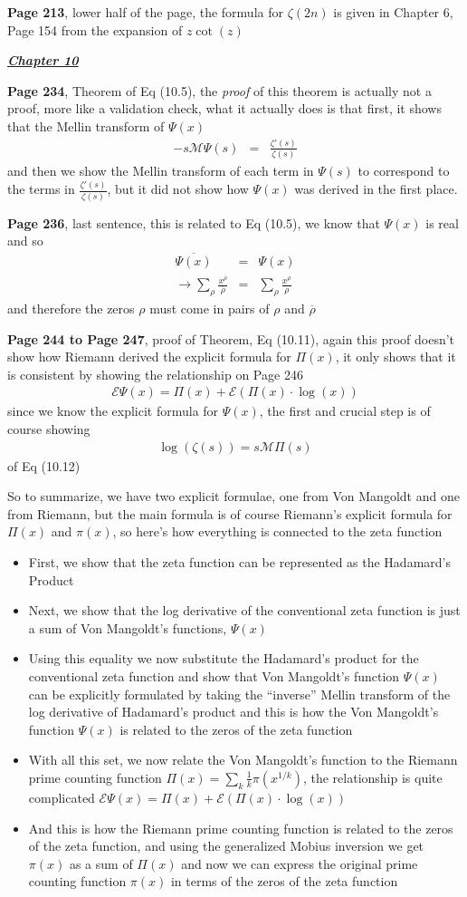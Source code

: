 \documentclass[aps,preprint,preprintnumbers,nofootinbib,showpacs,prd]{revtex4-1}
\newcommand{\bit}{\begin{itemize}}
\newcommand{\eit}{\end{itemize}}
\newcommand{\nbea}{\begin{eqnarray*}}
\newcommand{\neea}{\end{eqnarray*}}
\begin{document}
{\bf Page 213}, lower half of the page, the formula for $\zeta(2n)$ is given in Chapter 6, Page 154 from the expansion of $z\cot(z)$

\bigskip
\underline{\textit{\textbf{Chapter 10}}}
\bigskip

{\bf Page 234}, Theorem of Eq (10.5), the {\it proof} of this theorem is actually not a proof, more like a validation check, what it actually does is that first, it shows that the Mellin transform of $\Psi(x)$
%
\nbea
-s\mathcal{M}\Psi(s) & = & \frac{\zeta'(s)}{\zeta(s)}
\neea
%
and then we show the Mellin transform of each term in $\Psi(s)$ to correspond to the terms in $\frac{\zeta'(s)}{\zeta(s)}$, but it did not show how $\Psi(x)$ was derived in the first place.

{\bf Page 236}, last sentence, this is related to Eq (10.5), we know that $\Psi(x)$ is real and so
%
\nbea
\overline{\Psi(x)} & = & \Psi(x) \\
\to \sum_\rho \frac{x^{\overline\rho}}{\overline\rho} & = & \sum_\rho \frac{x^{\rho}}{\rho}
\neea
%
and therefore the zeros $\rho$ must come in pairs of $\rho$ and $\overline\rho$

{\bf Page 244 to Page 247}, proof of Theorem, Eq (10.11), again this proof doesn't show how Riemann derived the explicit formula for $\Pi(x)$, it only shows that it is consistent by showing the relationship on Page 246
%
\nbea
\mathcal{E}\Psi(x) = \Pi(x) + \mathcal{E}(\Pi(x)\cdot\log(x))
\neea
%
since we know the explicit formula for $\Psi(x)$, the first and crucial step is of course showing
%
\nbea
\log(\zeta(s)) = s\mathcal{M}\Pi(s)
\neea
%
of Eq (10.12)

So to summarize, we have two explicit formulae, one from Von Mangoldt and one from Riemann, but the main formula is of course Riemann's explicit formula for $\Pi(x)$ and $\pi(x)$, so here's how everything is connected to the zeta function
\bit
\item First, we show that the zeta function can be represented as the Hadamard's Product
\item Next, we show that the log derivative of the conventional zeta function is just a sum of Von Mangoldt's functions, $\Psi(x)$
\item Using this equality we now substitute the Hadamard's product for the conventional zeta function and show that Von Mangoldt's function $\Psi(x)$ can be explicitly formulated by taking the ``inverse'' Mellin transform of the log derivative of Hadamard's product and this is how the Von Mangoldt's function $\Psi(x)$ is related to the zeros of the zeta function
\item With all this set, we now relate the Von Mangoldt's function to the Riemann prime counting function $\Pi(x) = \sum_k \frac{1}{k}\pi(x^{1/k})$, the relationship is quite complicated $\mathcal{E}\Psi(x) = \Pi(x) + \mathcal{E}(\Pi(x)\cdot\log(x))$
\item And this is how the Riemann prime counting function is related to the zeros of the zeta function, and using the generalized Mobius inversion we get $\pi(x)$ as a sum of $\Pi(x)$ and now we can express the original prime counting function $\pi(x)$ in terms of the zeros of the zeta function
\eit
\end{document}
